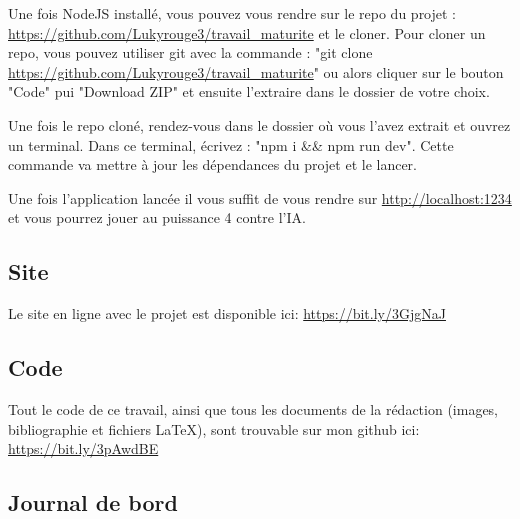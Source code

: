 \documentclass[a4paper]{article}
\begin{document}
    Une fois NodeJS installé, vous pouvez vous rendre sur le repo du projet : \url{https://github.com/Lukyrouge3/travail_maturite} et le cloner. Pour cloner un repo, vous pouvez utiliser git avec la commande : "git clone \url{https://github.com/Lukyrouge3/travail_maturite}" ou alors cliquer sur le bouton "Code" pui "Download ZIP" et ensuite l'extraire dans le dossier de votre choix.

    Une fois le repo cloné, rendez-vous dans le dossier où vous l'avez extrait et ouvrez un terminal.
    Dans ce terminal, écrivez : "npm i \&\& npm run dev". Cette commande va mettre à jour les dépendances du projet et le lancer.
    
    Une fois l'application lancée il vous suffit de vous rendre sur \url{http://localhost:1234} et vous pourrez jouer au puissance 4 contre l'IA.
\subsection{Site}
    Le site en ligne avec le projet est disponible ici: \url{https://bit.ly/3GjgNaJ}
\subsection{Code}
    Tout le code de ce travail, ainsi que tous les documents de la rédaction (images, bibliographie et fichiers LaTeX), sont trouvable sur mon github ici: \url{https://bit.ly/3pAwdBE}
\subsection{Journal de bord}
    
\end{document}
